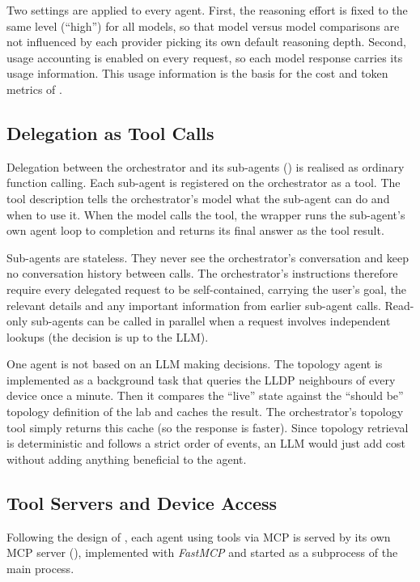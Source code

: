 Two settings are applied to every agent. First, the reasoning effort is fixed to the same level
(\enquote{high}) for all models, so that model versus model comparisons are not influenced by each provider picking its own
default reasoning depth. Second, usage accounting is enabled on every request, so each model response
carries its usage information. This usage information is the basis for the cost and token metrics of
.

\subsection{Delegation as Tool Calls}
\label{sec:impl-delegation}
Delegation between the orchestrator and its sub-agents () is realised as ordinary
function calling. Each sub-agent is registered on the orchestrator as a tool. The tool description tells
the orchestrator's model what the sub-agent can do and when to use it. When the model calls the tool, the
wrapper runs the sub-agent's own agent loop to completion and returns its final answer as the tool result.

Sub-agents are stateless. They never see the orchestrator's conversation and keep no conversation history between calls.
The orchestrator's instructions therefore require every delegated request to be self-contained, carrying
the user's goal, the relevant details and any important information from earlier sub-agent calls. Read-only sub-agents
can be called in parallel when a request involves independent lookups (the decision is up to the LLM).

One agent is not based on an LLM making decisions. The topology agent is implemented as a background task
that queries the LLDP neighbours of every device once a minute. Then it compares the \enquote{live} state against the \enquote{should be} topology
definition of the lab and caches the result. The orchestrator's topology tool simply returns this cache (so the response is faster).
Since topology retrieval is deterministic and follows a strict order of events, an LLM would just add cost without adding anything beneficial to the agent.

\subsection{Tool Servers and Device Access}
\label{sec:impl-tools}
Following the design of , each agent using tools via MCP is served by its own MCP server
(), implemented with \emph{FastMCP} \parencite{fastmcp} and started as a subprocess of the
main process.

